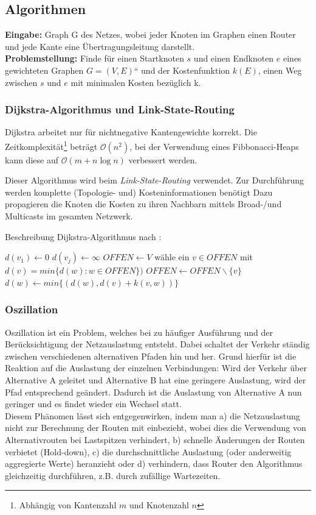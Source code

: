 \documentclass{article} %
\begin{document}
\subsection{Algorithmen}
\textbf{Eingabe:} Graph G des Netzes, wobei jeder Knoten im Graphen einen Router und jede Kante eine Übertragungsleitung darstellt.\\
\textbf{Problemstellung:} Finde für einen Startknoten $s$ und einen Endknoten $e$ eines gewichteten Graphen $G = (V,E)$“ und der Kostenfunktion $k(E)$, einen Weg zwischen $s$ und $e$ mit minimalen Kosten bezüglich k.
\subsubsection{Dijkstra-Algorithmus und Link-State-Routing}
Dijkstra arbeitet nur für nichtnegative Kantengewichte korrekt. 
Die Zeitkomplexität\footnote{Abhängig von Kantenzahl $m$ und Knotenzahl $n$} beträgt $\mathcal{O}(n^2)$, bei der Verwendung eines Fibbonacci-Heaps kann diese auf $\mathcal{O}(m + n \log{n})$ verbessert werden.

Dieser Algorithmus wird beim \emph{Link-State-Routing} verwendet.
Zur Durchführung werden komplette (Topologie- und) Kosteninformationen benötigt
Dazu propagieren die Knoten die Kosten zu ihren Nachbarn mittels Broad-/und Multicasts  im gesamten Netzwerk.

Beschreibung Dijkstra-Algorithmus nach \cite{brandstadt1994graphen}:
\begin{algorithmic}
	\State $d(v_1) \gets 0$
	 $d(v_j) \gets \infty$ \EndFor
	\State $OFFEN \gets V$
		\State wähle ein $v \in OFFEN$ mit $d(v) = min\{d(w) : w \in OFFEN\})$
		\State $OFFEN \gets OFFEN \backslash \{v\}$
			$d(w) \gets min\{(d(w),d(v) + k(v,w))\}$
		\EndFor
	\EndWhile
\end{algorithmic}

\subsubsection{Oszillation} 
Oszillation ist ein Problem, welches bei zu häufiger Ausführung und der Berücksichtigung der Netzauslastung entsteht.
Dabei schaltet der Verkehr ständig zwischen verschiedenen alternativen Pfaden hin und her.
Grund hierfür ist die Reaktion auf die Auslastung der einzelnen Verbindungen: 
Wird der Verkehr über Alternative A geleitet und Alternative B hat eine geringere Auslastung, wird der Pfad entsprechend geändert.
Dadurch ist die Auslastung von Alternative A nun geringer und es findet wieder ein Wechsel statt.\\
Diesem Phänomen lässt sich entgegenwirken, indem man a) die Netzauslastung nicht zur Berechnung der Routen mit einbezieht, wobei dies die Verwendung von Alternativrouten bei Lastspitzen verhindert, b) schnelle Änderungen der Routen verbietet (Hold-down), c) die durchschnittliche Auslastung (oder anderweitig aggregierte Werte) heranzieht\cite{comer2011tcp} oder d) verhindern, dass Router den Algorithmus gleichzeitig durchführen, z.B. durch zufällige Wartezeiten.
\end{document}
